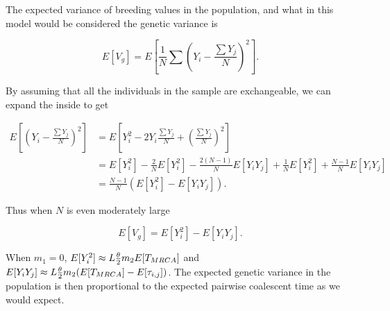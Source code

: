 The expected variance of breeding values in the population, and what in this
model would be considered the genetic variance is

\begin{equation}
  \label{eq:popvar}
  E[V_g] = E\left[ \frac{1}{N}\sum \left( Y_i - \frac{\sum Y_j}{N} \right)^2\right].
\end{equation}

By assuming that all the individuals in the sample are exchangeable, we can
expand the inside to get

\begin{align*}
  E\left[ \left(  Y_i - \frac{\sum Y_j}{N} \right)^2 \right] &= 
                                                             E\left[ Y_i^2 - 2Y_i\frac{\sum Y_j}{N} + \left( \frac{\sum Y_j}{N} \right)^2 \right] \\
                                                           &= E[Y_i^2] - \frac{2}{N} E[Y_i^2] - 
                                                             \frac{2(N-1)}{N} E[Y_iY_j] + \frac{1}{N} E[Y_i^2] + 
                                                             \frac{N-1}{N} E[Y_iY_j] \\
                                                           &= \frac{N-1}{N} \left( E[Y_i^2] - E[Y_iY_j]\right).
\end{align*}

Thus when $N$ is even moderately large

\begin{equation}
  E[V_g] = E[Y_i^2] - E[Y_iY_j].
\end{equation}

When $m_1=0$, $E[Y_i^2] \approx L \frac{\theta}{2} m_2 E[T_{MRCA}]$ and
$E[Y_iY_j] \approx L \frac{\theta}{2} m_2 ( E[T_{MRCA}] - E[\tau_{i,j}])$. The expected
genetic variance in the population is then proportional to the expected pairwise
coalescent time as we would expect.
